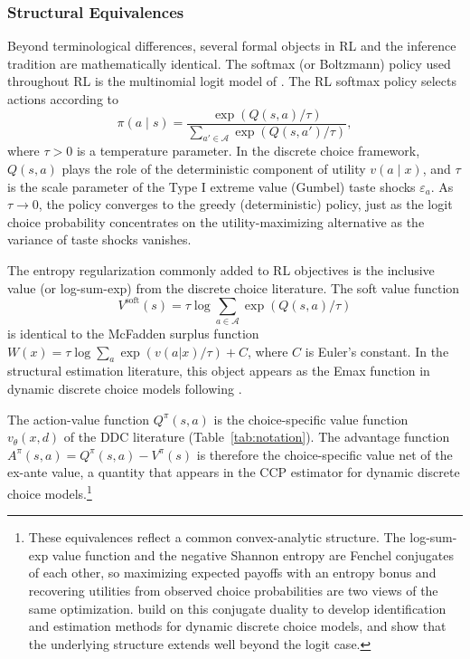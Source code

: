 \subsubsection{Structural Equivalences}
\label{subsec:structural_equivalences}

Beyond terminological differences, several formal objects in RL and the inference tradition are mathematically identical. The softmax (or Boltzmann) policy used throughout RL is the multinomial logit model of \citet{McFadden1974}. The RL softmax policy selects actions according to
\begin{equation}
\label{eq:softmax_logit}
\pi(a \mid s) = \frac{\exp(Q(s,a) / \tau)}{\sum_{a' \in \mathcal{A}} \exp(Q(s,a') / \tau)},
\end{equation}
where $\tau > 0$ is a temperature parameter. In the discrete choice framework, $Q(s,a)$ plays the role of the deterministic component of utility $v(a \mid x)$, and $\tau$ is the scale parameter of the Type I extreme value (Gumbel) taste shocks $\varepsilon_a$. As $\tau \to 0$, the policy converges to the greedy (deterministic) policy, just as the logit choice probability concentrates on the utility-maximizing alternative as the variance of taste shocks vanishes.

The entropy regularization commonly added to RL objectives is the inclusive value (or log-sum-exp) from the discrete choice literature. The soft value function
\begin{equation}
\label{eq:soft_value}
V^{\text{soft}}(s) = \tau \log \sum_{a \in \mathcal{A}} \exp(Q(s,a) / \tau)
\end{equation}
is identical to the McFadden surplus function $W(x) = \tau \log \sum_a \exp(v(a|x)/\tau) + C$, where $C$ is Euler's constant. In the structural estimation literature, this object appears as the Emax function in dynamic discrete choice models following \citet{Rust1987}.

The action-value function $Q^\pi(s,a)$ is the choice-specific value function $v_\theta(x,d)$ of the DDC literature (Table~\ref{tab:notation}). The advantage function $A^\pi(s,a) = Q^\pi(s,a) - V^\pi(s)$ is therefore the choice-specific value net of the ex-ante value, a quantity that appears in the \citet{HotzMiller1993} CCP estimator for dynamic discrete choice models.\footnote{These equivalences reflect a common convex-analytic structure. The log-sum-exp value function and the negative Shannon entropy are Fenchel conjugates of each other, so maximizing expected payoffs with an entropy bonus and recovering utilities from observed choice probabilities are two views of the same optimization. \citet{ChiongGalichonShum2016} build on this conjugate duality to develop identification and estimation methods for dynamic discrete choice models, and \citet{FosgerauSorensen2022} show that the underlying structure extends well beyond the logit case.}

